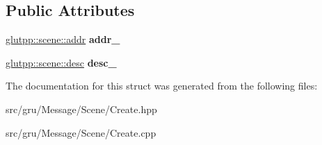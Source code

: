 \subsection*{\-Public \-Attributes}
\begin{DoxyCompactItemize}
\item 
\hypertarget{structglutpp_1_1network_1_1scene_1_1create_a56b5904bc6785c68e7e85ef5ddf27bee}{\hyperlink{classglutpp_1_1scene_1_1addr}{glutpp\-::scene\-::addr} {\bfseries addr\-\_\-}}\label{structglutpp_1_1network_1_1scene_1_1create_a56b5904bc6785c68e7e85ef5ddf27bee}

\item 
\hypertarget{structglutpp_1_1network_1_1scene_1_1create_a43f9f4c58b0310c0eeb41cb057f74958}{\hyperlink{classglutpp_1_1scene_1_1desc}{glutpp\-::scene\-::desc} {\bfseries desc\-\_\-}}\label{structglutpp_1_1network_1_1scene_1_1create_a43f9f4c58b0310c0eeb41cb057f74958}

\end{DoxyCompactItemize}


\-The documentation for this struct was generated from the following files\-:\begin{DoxyCompactItemize}
\item 
src/gru/\-Message/\-Scene/\-Create.\-hpp\item 
src/gru/\-Message/\-Scene/\-Create.\-cpp\end{DoxyCompactItemize}
